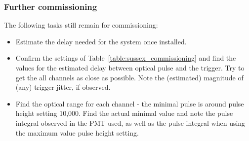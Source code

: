 \subsubsection*{Further commissioning}

The following tasks still remain for commissioning:
\begin{itemize}
\item Estimate the delay needed for the system once installed.
\item Confirm the settings of Table~\ref{table:sussex_commissioning} and find the values for the estimated delay between optical pulse and the trigger. Try to get the all channels as close as possible. Note the (estimated) magnitude of (any) trigger jitter, if observed.
\item Find the optical range for each channel - the minimal pulse is around pulse height setting 10,000. Find the actual minimal value and note the pulse integral observed in the PMT used, as well as the pulse integral when using the maximum value pulse height setting.
\end{itemize}